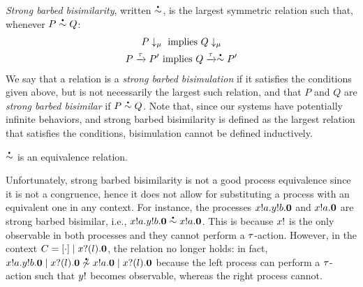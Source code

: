 \documentclass[runningheads]{llncs}
\begin{document}
\emph{Strong barbed bisimilarity}, written \( \sbbisim{}{} \), is the largest symmetric relation such that, whenever \( \sbbisim{P}{Q} \):
\begin{gather}
  \observable{P}{\mu}~\textrm{implies}~\observable{Q}{\mu} \label{eq:bisim1}\\
  \transition{P}{\Atau}{P'}~\textrm{implies}~\transition{Q}{\Atau}{\sbbisim{}{} P'} \label{eq:bisim2}
\end{gather}
We say that a relation is a \emph{strong barbed bisimulation} if it satisfies the conditions given above, but is not necessarily the largest such relation, and that \( P \) and \( Q \) are \emph{strong barbed bisimilar} if \( \sbbisim{P}{Q} \).
Note that, since our systems have potentially infinite behaviors, and strong barbed bisimilarity is defined as the largest relation that satisfies the conditions, bisimulation cannot be defined inductively.

\begin{theorem}\label{thm:bisim-equiv}
  \( \sbbisim{}{} \) is an equivalence relation. %
\end{theorem}

Unfortunately, strong barbed bisimilarity is not a good process
equivalence since it is not a congruence, hence it does not allow for
substituting a process with an equivalent one in any context.
For instance, the processes $x ! a . y ! b . \bm{0}$ and
$x ! a . \bm{0}$ are strong barbed bisimilar, i.e.,
$\sbbisim{\Pout{x}{a}{\Pout{y}{b}{\Pend}}}{\Pout{x}{a}{\Pend}}$. This
is because \( x! \) is the only observable in both processes
and they cannot perform a \( \tau \)-action. However, in the context
$C = [\cdot] \mid x ? (l) . \bm{0}$, the relation no
longer holds: in fact,
$\nsbbisim{\Ppar{\Pout{x}{a}{\Pout{y}{b}{\Pend}}}{\Pin{x}{l}{\Pend}}}{\Pout{x}{a}{\Pend}\Ppar{}{\Pin{x}{l}{\Pend}}}$
%
because the left process can perform a \( \tau \)-action such that
\( y! \) becomes observable, whereas the right process cannot.

\end{document}
